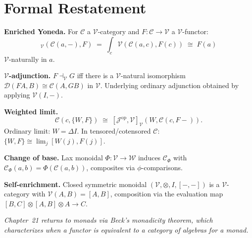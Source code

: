 \section*{Formal Restatement}

\begin{formalrestatement}
\textbf{Enriched Yoneda.} For $\mathcal{C}$ a $\mathcal{V}$-category and
$F : \mathcal{C} \to \mathcal{V}$ a $\mathcal{V}$-functor:
\begin{equation*}
  [\mathcal{C},\mathcal{V}]_\mathcal{V}(\mathcal{C}(a,-), F) \;=\;
  \int_c \mathcal{V}(\mathcal{C}(a,c), F(c)) \;\cong\; F(a)
\end{equation*}
$\mathcal{V}$-naturally in $a$.

\medskip
\textbf{$\mathcal{V}$-adjunction.} $F \dashv_\mathcal{V} G$ iff there is a
$\mathcal{V}$-natural isomorphism $\mathcal{D}(FA,B) \cong \mathcal{C}(A,GB)$
in $\mathcal{V}$. Underlying ordinary adjunction obtained by applying
$\mathcal{V}(I,-)$.

\medskip
\textbf{Weighted limit.}
\begin{equation*}
  \mathcal{C}(c, \{W,F\}) \;\cong\;
  [\mathcal{J}^{\mathrm{op}},\mathcal{V}]_\mathcal{V}(W, \mathcal{C}(c,F-)).
\end{equation*}
Ordinary limit: $W = \Delta I$. In tensored/cotensored $\mathcal{C}$: $\{W,F\}
\cong \lim_j [W(j), F(j)]$.

\medskip
\textbf{Change of base.} Lax monoidal $\Phi : \mathcal{V} \to \mathcal{W}$
induces $\mathcal{C}_\Phi$ with $\mathcal{C}_\Phi(a,b) = \Phi(\mathcal{C}(a,b))$,
composites via $\phi$-comparisons.

\medskip
\textbf{Self-enrichment.} Closed symmetric monoidal $(\mathcal{V},\otimes,I,[-,-])$
is a $\mathcal{V}$-category with $\mathcal{V}(A,B) = [A,B]$, composition via
the evaluation map $[B,C]\otimes[A,B]\otimes A \to C$.

\medskip
\noindent\textit{Chapter~21 returns to monads via Beck's monadicity theorem,
which characterizes when a functor is equivalent to a category of algebras
for a monad.}
\end{formalrestatement}
